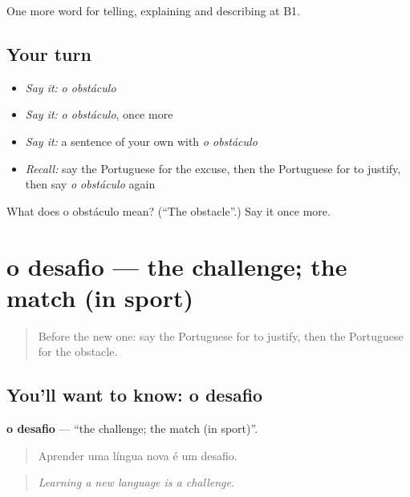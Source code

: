 \begin{grammarlens}[title={What you've built}]
One more word for telling, explaining and describing at B1.
\end{grammarlens}

\subsection*{Your turn}
\begin{itemize}
\raggedright
  \item \emph{Say it:} \emph{o obstáculo}
  \item \emph{Say it:} \emph{o obstáculo}, once more
  \item \emph{Say it:} a sentence of your own with \emph{o obstáculo}
  \item \emph{Recall:} say the Portuguese for the excuse, then the Portuguese for to justify, then say \emph{o obstáculo} again
\end{itemize}

\begin{tcolorbox}[breakable,colback=teal!4,colframe=teal!35!black,title={Before you move on}]
What does o obstáculo mean? (\textquotedblleft{}The obstacle\textquotedblright{}.) Say it once more.
\end{tcolorbox}
\section[o desafio]{o desafio — the challenge; the match (in sport)}

\label{lesson:PT-C353-desafio}



\begin{quote}
Before the new one: say the Portuguese for to justify, then the Portuguese for the obstacle.
\end{quote}

\subsection*{You'll want to know: o desafio}
\textbf{o desafio} — \textquotedblleft{}the challenge; the match (in sport)\textquotedblright{}.

\begin{quote}
Aprender uma língua nova é um desafio.
\end{quote}

\begin{quote}
\emph{Learning a new language is a challenge.}
\end{quote}

